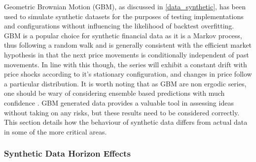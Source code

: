 \documentclass[a4paper,11pt,oneside]{article}
\theoremstyle{plain}
\theoremstyle{definition}
\begin{document}
	Geometric Brownian Motion (GBM), as discussed in \ref{data_synthetic}, has been used to simulate synthetic datasets for the purposes of testing implementations and configurations without influencing the likelihood of backtest overfitting. GBM is a popular choice for synthetic financial data as it is a Markov process, thus following a random walk and is generally consistent with the efficient market hypothesis in that the next price movements is conditionally independent of past movements. In line with this though, the series will exhibit a constant drift with price shocks according to it's stationary configuration, and changes in price follow a particular distribution. It is worth noting that as GBM are non ergodic series, one should be wary of considering ensemble based predictions with much confidence \cite{Peters}. GBM generated data provides a valuable tool in assessing ideas without taking on any risks, but these results need to be considered correctly. This section details how the behaviour of synthetic data differs from actual data in some of the more critical areas.
	
	\subsubsection{Synthetic Data Horizon Effects}\label{results_synthdata_mse}
	
\end{document}
